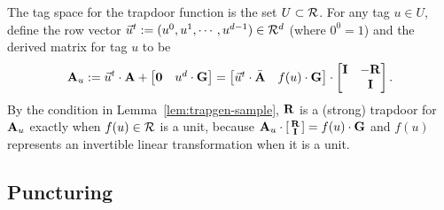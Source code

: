 The tag space for the trapdoor function is the set $U \subset \mathcal{R}$.
For any tag $u \in U$, define the row vector $\vec{u}^{t} := (u^{0},
u^{1}, \cdots, u^{d-1}) \in \mathcal{R}^{d}$ (where $0^{0}=1$) and the
derived matrix for tag $u$ to be
\[ \mathbf{A}_{u} := \vec{u}^{t} \cdot \mathbf{A} +
\begin{bmatrix}
  \mathbf{0} & u^{d} \cdot \mathbf{G}
\end{bmatrix}
=
\begin{bmatrix}
  \vec{u}^{t} \cdot \bar{\mathbf{A}} & f(u) \cdot \mathbf{G}
\end{bmatrix} \cdot \begin{bmatrix} \mathbf{I} & -\mathbf{R} \\ & \mathbf{I} \end{bmatrix}.
\]
By the condition in Lemma~\ref{lem:trapgen-sample}, $\mathbf{R}$ is a
(strong) trapdoor for $\mathbf{A}_{u}$ exactly when $f(u) \in \mathcal{R}$ is a
unit, because $\mathbf{A}_{u} \cdot \left[
  \begin{smallmatrix}
    \mathbf{R} \\ \mathbf{I}
  \end{smallmatrix} \right] = f(u) \cdot \mathbf{G}$ and $f(u)$ represents
an invertible linear transformation when it is a unit. 

\subsection{Puncturing}
\label{sec:puncturing}


